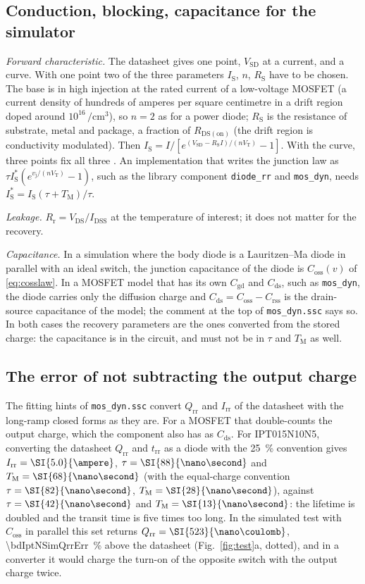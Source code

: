 \documentclass[10pt,a4paper]{scrartcl}
\newcommand{\Irr}{I_\mathrm{rr}}
\newcommand{\Qrr}{Q_\mathrm{rr}}
\newcommand{\Coss}{C_\mathrm{oss}}
\newcommand{\Crss}{C_\mathrm{rss}}
\newcommand{\Cds}{C_\mathrm{ds}}
\newcommand{\Cgd}{C_\mathrm{gd}}
\newcommand{\trr}{t_\mathrm{rr}}
\newcommand{\TM}{T_\mathrm{M}}
\newcommand{\vj}{v_\mathrm{j}}
\newcommand{\IS}{I_\mathrm{S}}
\newcommand{\RS}{R_\mathrm{S}}
\newcommand{\Rr}{R_\mathrm{r}}
\newcommand{\Rds}{R_\mathrm{DS(on)}}
\newcommand{\VT}{V_\mathrm{T}}
\newcommand{\VSD}{V_\mathrm{SD}}
\newcommand{\VDS}{V_\mathrm{DS}}
\newcommand{\IPT}{IPT015N10N5}
\begin{document}
\subsection{Conduction, blocking, capacitance for the simulator}
\label{sec:static}
\emph{Forward characteristic.} The datasheet gives one point, $\VSD$ at a current, and a curve. With one point two of the three parameters $\IS$, $n$, $\RS$ have to be chosen. The base is in high injection at the rated current of a low-voltage MOSFET (a current density of hundreds of amperes per square centimetre in a drift region doped around $10^{16}\,\si{\per\centi\metre\cubed}$), so $n = 2$ as for a power diode; $\RS$ is the resistance of substrate, metal and package, a fraction of $\Rds$ (the drift region is conductivity modulated). Then $\IS = I/[e^{(\VSD - \RS I)/(n\VT)} - 1]$. With the curve, three points fix all three \cite{lmnote}. An implementation that writes the junction law as $\tau\IS^{*}(e^{\vj/(n\VT)}-1)$, such as the library component \texttt{diode\_rr} and \texttt{mos\_dyn}, needs $\IS^{*} = \IS(\tau+\TM)/\tau$.

\emph{Leakage.} $\Rr = \VDS/I_\mathrm{DSS}$ at the temperature of interest; it does not matter for the recovery.

\emph{Capacitance.} In a simulation where the body diode is a Lauritzen--Ma diode in parallel with an ideal switch, the junction capacitance of the diode is $\Coss(v)$ of \eqref{eq:cosslaw}. In a MOSFET model that has its own $\Cgd$ and $\Cds$, such as \texttt{mos\_dyn}, the diode carries only the diffusion charge and $\Cds = \Coss - \Crss$ is the drain-source capacitance of the model; the comment at the top of \texttt{mos\_dyn.ssc} says so. In both cases the recovery parameters are the ones converted from the stored charge: the capacitance is in the circuit, and must not be in $\tau$ and $\TM$ as well.

\subsection{The error of not subtracting the output charge}
\label{sec:naive}
The fitting hints of \texttt{mos\_dyn.ssc} \cite{mosdyn} convert $\Qrr$ and $\Irr$ of the datasheet with the long-ramp closed forms as they are. For a MOSFET that double-counts the output charge, which the component also has as $\Cds$. For \IPT{}, converting the datasheet $\Qrr$ and $\trr$ as a diode with the \SI{25}{\percent} convention gives $\Irr = \SI{\bdIptNIrr}{\ampere}$, $\tau = \SI{\bdIptNTau}{\nano\second}$ and $\TM = \SI{\bdIptNTm}{\nano\second}$ (with the equal-charge convention $\tau = \SI{\bdIptNTriTau}{\nano\second}$, $\TM = \SI{\bdIptNTriTm}{\nano\second}$), against $\tau = \SI{\bdIptRefTau}{\nano\second}$ and $\TM = \SI{\bdIptRefTm}{\nano\second}$: the lifetime is doubled and the transit time is five times too long. In the simulated test with $\Coss$ in parallel this set returns $\Qrr = \SI{\bdIptNSimQrr}{\nano\coulomb}$, \SI{\bdIptNSimQrrErr}{\percent} above the datasheet (Fig.~\ref{fig:test}a, dotted), and in a converter it would charge the turn-on of the opposite switch with the output charge twice.
\end{document}
